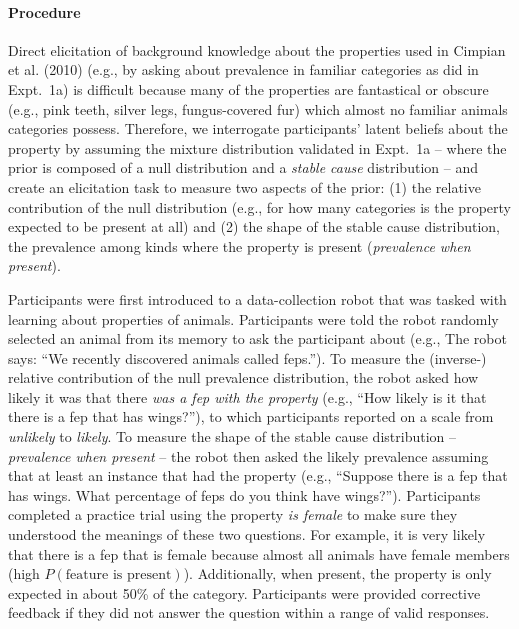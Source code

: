 \documentclass[floatsintext,doc]{apa6}
\let\oldparagraph\paragraph
\renewcommand{\paragraph}[1]{\oldparagraph{#1}\mbox{}}
\begin{document}
\paragraph{Procedure}
Direct elicitation of background knowledge about the properties used in Cimpian et al. (2010) (e.g., by asking about prevalence in familiar
categories as did in Expt.~1a) is difficult because many of the properties are fantastical or obscure (e.g., pink teeth, silver legs, fungus-covered fur) which almost no familiar animals categories possess. 
Therefore,  we interrogate participants' latent beliefs about the property by assuming the mixture distribution validated in Expt.~1a -- where the prior is composed of a null distribution and a  \emph{stable cause} distribution -- and create an elicitation task to measure two aspects of the prior: (1) the relative contribution of the null distribution (e.g., for how many categories is the
property expected to be present at all) and (2) the shape of the stable cause distribution, the prevalence among
kinds where the property is present (\emph{prevalence when present}).

Participants were first introduced to a data-collection robot that was tasked with learning about properties of animals. Participants
were told the robot randomly selected an animal from its memory to ask
the participant about (e.g., The robot says: \enquote{We recently
discovered animals called feps.}). To measure the (inverse-) relative contribution
of the null prevalence distribution, the robot asked how likely it was
that there \emph{was a fep with the property} (e.g., \enquote{How likely is
it that there is a fep that has wings?}), to which participants reported
on a scale from \emph{unlikely} to \emph{likely}. To measure the shape of the stable cause distribution -- \emph{prevalence when present} -- the robot then asked the likely
prevalence assuming that at least an instance that had the property (e.g.,
\enquote{Suppose there is a fep that has wings. What percentage of feps
do you think have wings?}). Participants completed a practice trial
using the property \emph{is female} to make sure they understood the
meanings of these two questions. For example, it is very likely that
there is a fep that is female because almost all animals have female
members (high \(P(\text{feature is present})\)). Additionally, when
present, the property is only expected in about 50\% of the category.
Participants were provided corrective feedback if they did not answer the question within a range of valid responses.
\end{document}
